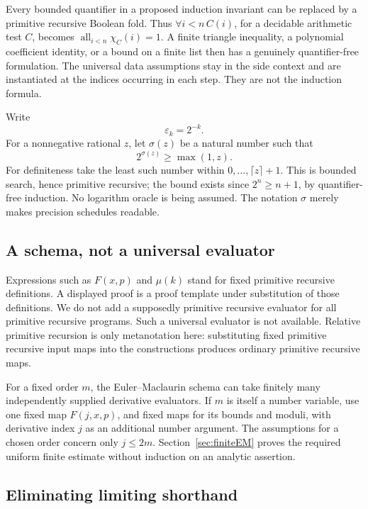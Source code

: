 \documentclass[11pt]{article}
\theoremstyle{definition}
\newcommand{\eps}{\varepsilon}
\begin{document}
Every bounded quantifier in a proposed induction invariant can be
replaced by a primitive recursive Boolean fold.  Thus
\(\forall i<n\,C(i)\), for a decidable arithmetic test \(C\), becomes
\(\operatorname{all}_{i<n}\chi_C(i)=1\).  A finite triangle inequality,
a polynomial coefficient identity, or a bound on a finite list then
has a genuinely quantifier-free formulation.  The universal data
assumptions stay in the side context and are instantiated at the
indices occurring in each step.  They are not the induction formula.

Write
\[
 \eps_k=2^{-k}.
\]
For a nonnegative rational \(z\), let \(\sigma(z)\) be a natural number
such that
\begin{equation}
 2^{\sigma(z)}\ge\max(1,z).\label{eq:sigma}
\end{equation}
For definiteness take the least such number within
\(0,\ldots,\lceil z\rceil+1\).  This is bounded search, hence primitive
recursive; the bound exists since \(2^n\ge n+1\), by quantifier-free
induction.  No logarithm oracle is being assumed.  The notation
\(\sigma\) merely makes precision schedules readable.

\subsection{A schema, not a universal evaluator}

Expressions such as \(F(x,p)\) and \(\mu(k)\) stand for fixed primitive
recursive definitions.  A displayed proof is a proof template under
substitution of those definitions.  We do not add a supposedly primitive
recursive evaluator for all primitive recursive programs.  Such a
universal evaluator is not available.  Relative primitive recursion is
only metanotation here: substituting fixed primitive recursive input
maps into the constructions produces ordinary primitive recursive
maps.

For a fixed order \(m\), the Euler--Maclaurin schema can take finitely
many independently supplied derivative evaluators.  If \(m\) is itself
a number variable, use one fixed map \(F(j,x,p)\), and fixed maps for
its bounds and moduli, with derivative index \(j\) as an additional
number argument.  The assumptions for a chosen order concern only
\(j\le2m\).  Section~\ref{sec:finiteEM} proves the required uniform
finite estimate without induction on an analytic assertion.

\subsection{Eliminating limiting shorthand}\label{sec:closure}
\end{document}
